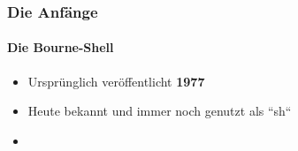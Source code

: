 \documentclass[12pt,utf8]{beamer}
\begin{document}
	\begin{frame}
		\frametitle{Die Anfänge}
		\framesubtitle{Die Bourne-Shell}
		\begin{itemize}
			\item Ursprünglich veröffentlicht \textbf{1977}
			\item Heute bekannt und immer noch genutzt als ``sh``
			\item 
		\end{itemize}
	\end{frame}
\end{document}

